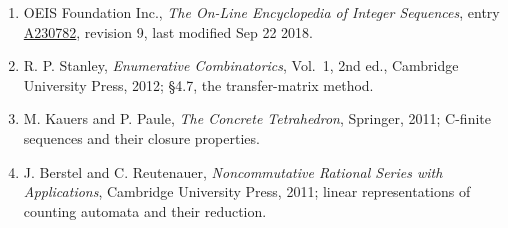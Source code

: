 \documentclass[11pt]{article}
\theoremstyle{definition}
\begin{document}
\begin{enumerate}

\item OEIS Foundation Inc., \emph{The On-Line Encyclopedia of Integer Sequences}, entry \href{https://oeis.org/A230782}{A230782}, revision 9, last modified Sep 22 2018.

\item R. P. Stanley, \emph{Enumerative Combinatorics}, Vol.~1, 2nd ed., Cambridge University Press, 2012; \S4.7, the transfer-matrix method.

\item M. Kauers and P. Paule, \emph{The Concrete Tetrahedron}, Springer, 2011; C-finite sequences and their closure properties.

\item J. Berstel and C. Reutenauer, \emph{Noncommutative Rational Series with Applications}, Cambridge University Press, 2011; linear representations of counting automata and their reduction.

\end{enumerate}
\end{document}
